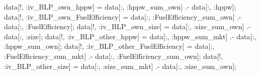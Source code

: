 \documentclass[
  letterpaper,
  DIV=11,
  numbers=noendperiod]{scrreprt}
\newenvironment{Shaded}{\begin{snugshade}}{\end{snugshade}}
\newcommand{\NormalTok}[1]{\textcolor[rgb]{0.00,0.23,0.31}{#1}}
\newcommand{\OperatorTok}[1]{\textcolor[rgb]{0.37,0.37,0.37}{#1}}
\begin{document}
\begin{Shaded}
\begin{Highlighting}[]
\NormalTok{data[!, }\OperatorTok{:}\NormalTok{iv\_BLP\_own\_hppw]             }\OperatorTok{=}\NormalTok{ data[}\OperatorTok{:}\NormalTok{, }\OperatorTok{:}\NormalTok{hppw\_sum\_own]           }\OperatorTok{.{-}}\NormalTok{ data[}\OperatorTok{:}\NormalTok{, }\OperatorTok{:}\NormalTok{hppw];}
\NormalTok{data[!, }\OperatorTok{:}\NormalTok{iv\_BLP\_own\_FuelEfficiency]   }\OperatorTok{=}\NormalTok{ data[}\OperatorTok{:}\NormalTok{, }\OperatorTok{:}\NormalTok{FuelEfficiency\_sum\_own] }\OperatorTok{.{-}}\NormalTok{ data[}\OperatorTok{:}\NormalTok{, }\OperatorTok{:}\NormalTok{FuelEfficiency];}
\NormalTok{data[!, }\OperatorTok{:}\NormalTok{iv\_BLP\_own\_size]             }\OperatorTok{=}\NormalTok{ data[}\OperatorTok{:}\NormalTok{, }\OperatorTok{:}\NormalTok{size\_sum\_own]           }\OperatorTok{.{-}}\NormalTok{ data[}\OperatorTok{:}\NormalTok{, }\OperatorTok{:}\NormalTok{size];}
\NormalTok{data[!, }\OperatorTok{:}\NormalTok{iv\_BLP\_other\_hppw]           }\OperatorTok{=}\NormalTok{ data[}\OperatorTok{:}\NormalTok{, }\OperatorTok{:}\NormalTok{hppw\_sum\_mkt]           }\OperatorTok{.{-}}\NormalTok{ data[}\OperatorTok{:}\NormalTok{, }\OperatorTok{:}\NormalTok{hppw\_sum\_own];}
\NormalTok{data[!, }\OperatorTok{:}\NormalTok{iv\_BLP\_other\_FuelEfficiency] }\OperatorTok{=}\NormalTok{ data[}\OperatorTok{:}\NormalTok{, }\OperatorTok{:}\NormalTok{FuelEfficiency\_sum\_mkt] }\OperatorTok{.{-}}\NormalTok{ data[}\OperatorTok{:}\NormalTok{, }\OperatorTok{:}\NormalTok{FuelEfficiency\_sum\_own];}
\NormalTok{data[!, }\OperatorTok{:}\NormalTok{iv\_BLP\_other\_size]           }\OperatorTok{=}\NormalTok{ data[}\OperatorTok{:}\NormalTok{, }\OperatorTok{:}\NormalTok{size\_sum\_mkt]           }\OperatorTok{.{-}}\NormalTok{ data[}\OperatorTok{:}\NormalTok{, }\OperatorTok{:}\NormalTok{size\_sum\_own];}


\end{Highlighting}
\end{Shaded}
\end{document}
